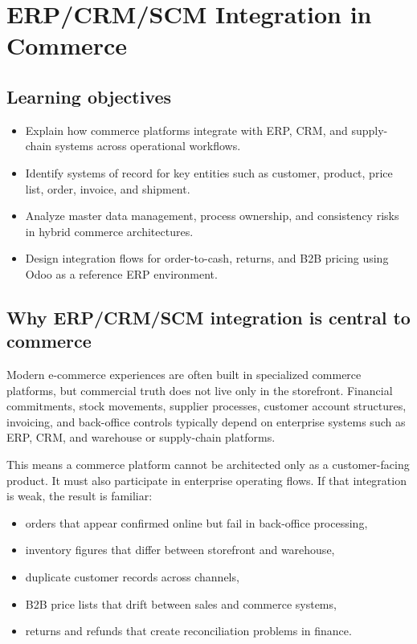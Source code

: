 \chapter{ERP/CRM/SCM Integration in Commerce}

\section{Learning objectives}
\begin{itemize}
  \item Explain how commerce platforms integrate with ERP, CRM, and supply-chain systems across operational workflows.
  \item Identify systems of record for key entities such as customer, product, price list, order, invoice, and shipment.
  \item Analyze master data management, process ownership, and consistency risks in hybrid commerce architectures.
  \item Design integration flows for order-to-cash, returns, and B2B pricing using Odoo as a reference ERP environment.
\end{itemize}

\section{Why ERP/CRM/SCM integration is central to commerce}
Modern e-commerce experiences are often built in specialized commerce platforms, but commercial truth does not live only in the storefront.
Financial commitments, stock movements, supplier processes, customer account structures, invoicing, and back-office controls typically depend on enterprise systems such as ERP, CRM, and warehouse or supply-chain platforms.

This means a commerce platform cannot be architected only as a customer-facing product.
It must also participate in enterprise operating flows.
If that integration is weak, the result is familiar:
\begin{itemize}
  \item orders that appear confirmed online but fail in back-office processing,
  \item inventory figures that differ between storefront and warehouse,
  \item duplicate customer records across channels,
  \item B2B price lists that drift between sales and commerce systems,
  \item returns and refunds that create reconciliation problems in finance.
\end{itemize}


